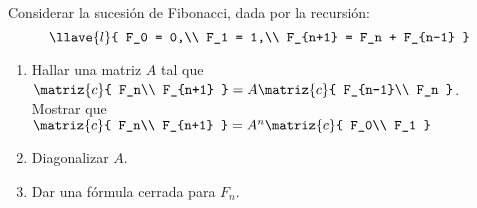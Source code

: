 \begin{enunciado}{\ejercicio}
  Considerar la sucesión de Fibonacci, dada por la recursión:
  $$
    \llave{l}{
      F_0 = 0,\\
      F_1 = 1,\\
      F_{n+1} = F_n + F_{n-1}
    }
  $$
  \begin{enumerate}[label=(\alph*)]
    \item Hallar una matriz $A$ tal que
          $
            \matriz{c}{
              F_n\\
              F_{n+1}
            }
            = A
            \matriz{c}{
              F_{n-1}\\
              F_n
            }$.
          Mostrar que
          $\matriz{c}{
              F_n\\
              F_{n+1}
            }
            = A^n
            \matriz{c}{
              F_0\\
              F_1
            }
          $

    \item Diagonalizar $A$.

    \item Dar una fórmula cerrada para $F_n$.
  \end{enumerate}
\end{enunciado}

